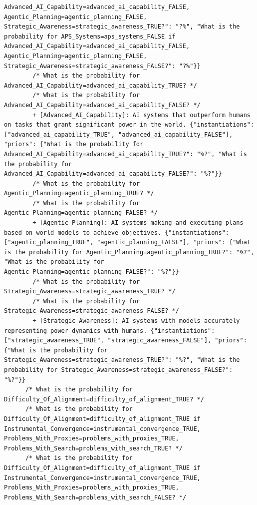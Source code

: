 \documentclass[
  11pt,
  letterpaper,
]{book}
\begin{document}
\begin{verbatim}
Advanced_AI_Capability=advanced_ai_capability_FALSE, Agentic_Planning=agentic_planning_FALSE, Strategic_Awareness=strategic_awareness_TRUE?": "?%", "What is the probability for APS_Systems=aps_systems_FALSE if Advanced_AI_Capability=advanced_ai_capability_FALSE, Agentic_Planning=agentic_planning_FALSE, Strategic_Awareness=strategic_awareness_FALSE?": "?%"}}
        /* What is the probability for Advanced_AI_Capability=advanced_ai_capability_TRUE? */
        /* What is the probability for Advanced_AI_Capability=advanced_ai_capability_FALSE? */
        + [Advanced_AI_Capability]: AI systems that outperform humans on tasks that grant significant power in the world. {"instantiations": ["advanced_ai_capability_TRUE", "advanced_ai_capability_FALSE"], "priors": {"What is the probability for Advanced_AI_Capability=advanced_ai_capability_TRUE?": "%?", "What is the probability for Advanced_AI_Capability=advanced_ai_capability_FALSE?": "%?"}}
        /* What is the probability for Agentic_Planning=agentic_planning_TRUE? */
        /* What is the probability for Agentic_Planning=agentic_planning_FALSE? */
        + [Agentic_Planning]: AI systems making and executing plans based on world models to achieve objectives. {"instantiations": ["agentic_planning_TRUE", "agentic_planning_FALSE"], "priors": {"What is the probability for Agentic_Planning=agentic_planning_TRUE?": "%?", "What is the probability for Agentic_Planning=agentic_planning_FALSE?": "%?"}}
        /* What is the probability for Strategic_Awareness=strategic_awareness_TRUE? */
        /* What is the probability for Strategic_Awareness=strategic_awareness_FALSE? */
        + [Strategic_Awareness]: AI systems with models accurately representing power dynamics with humans. {"instantiations": ["strategic_awareness_TRUE", "strategic_awareness_FALSE"], "priors": {"What is the probability for Strategic_Awareness=strategic_awareness_TRUE?": "%?", "What is the probability for Strategic_Awareness=strategic_awareness_FALSE?": "%?"}}
      /* What is the probability for Difficulty_Of_Alignment=difficulty_of_alignment_TRUE? */
      /* What is the probability for Difficulty_Of_Alignment=difficulty_of_alignment_TRUE if Instrumental_Convergence=instrumental_convergence_TRUE, Problems_With_Proxies=problems_with_proxies_TRUE, Problems_With_Search=problems_with_search_TRUE? */
      /* What is the probability for Difficulty_Of_Alignment=difficulty_of_alignment_TRUE if Instrumental_Convergence=instrumental_convergence_TRUE, Problems_With_Proxies=problems_with_proxies_TRUE, Problems_With_Search=problems_with_search_FALSE? */

\end{verbatim}
\end{document}
